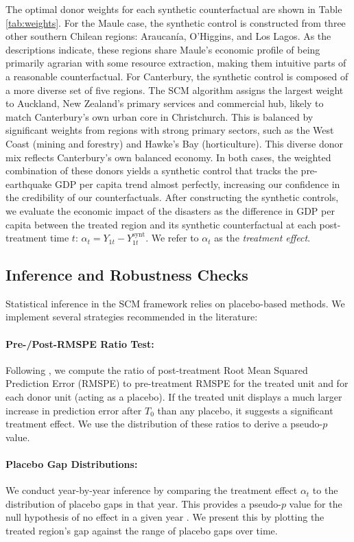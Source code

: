 \documentclass[12pt]{article}
\begin{document}
The optimal donor weights for each synthetic counterfactual are shown in Table \ref{tab:weights}. For the Maule case, the synthetic control is constructed from three other southern Chilean regions: Araucanía, O’Higgins, and Los Lagos. As the descriptions indicate, these regions share Maule's economic profile of being primarily agrarian with some resource extraction, making them intuitive parts of a reasonable counterfactual. For Canterbury, the synthetic control is composed of a more diverse set of five regions. The SCM algorithm assigns the largest weight to Auckland, New Zealand's primary services and commercial hub, likely to match Canterbury's own urban core in Christchurch. This is balanced by significant weights from regions with strong primary sectors, such as the West Coast (mining and forestry) and Hawke's Bay (horticulture). This diverse donor mix reflects Canterbury's own balanced economy. In both cases, the weighted combination of these donors yields a synthetic control that tracks the pre-earthquake GDP per capita trend almost perfectly, increasing our confidence in the credibility of our counterfactuals. After constructing the synthetic controls, we evaluate the economic impact of the disasters as the difference in GDP per capita between the treated region and its synthetic counterfactual at each post-treatment time $t$: $\alpha_t = Y_{1t} - Y_{1t}^{\text{synt}}$. We refer to $\alpha_t$ as the \textit{treatment effect}.

\subsection{Inference and Robustness Checks}
Statistical inference in the SCM framework relies on placebo-based methods. We implement several strategies recommended in the literature:

\paragraph{Pre-/Post-RMSPE Ratio Test:} Following \textcite{abadie2010synthetic}, we compute the ratio of post-treatment Root Mean Squared Prediction Error (RMSPE) to pre-treatment RMSPE for the treated unit and for each donor unit (acting as a placebo). If the treated unit displays a much larger increase in prediction error after $T_0$ than any placebo, it suggests a significant treatment effect. We use the distribution of these ratios to derive a pseudo-$p$ value.

\paragraph{Placebo Gap Distributions:} We conduct year-by-year inference by comparing the treatment effect $\alpha_t$ to the distribution of placebo gaps in that year. This provides a pseudo-$p$ value for the null hypothesis of no effect in a given year \autocite{firpo2018synthetic}. We present this by plotting the treated region’s gap against the range of placebo gaps over time.
\end{document}
